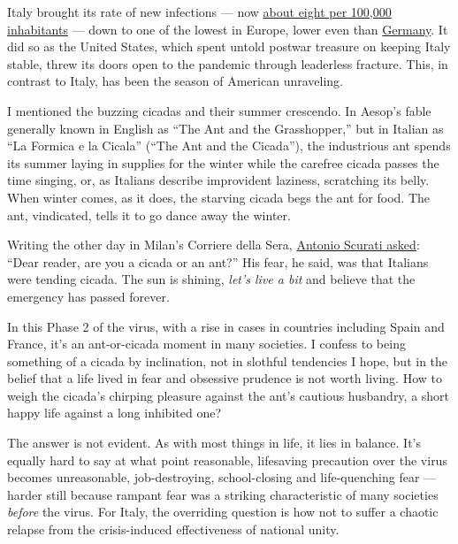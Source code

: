Italy brought its rate of new infections --- now
\href{https://www.nytimes3xbfgragh.onion/interactive/2020/world/europe/italy-coronavirus-cases.html}{about
eight per 100,000 inhabitants} --- down to one of the lowest in Europe,
lower even than
\href{https://www.nytimes3xbfgragh.onion/interactive/2020/world/europe/germany-coronavirus-cases.html}{Germany}.
It did so as the United States, which spent untold postwar treasure on
keeping Italy stable, threw its doors open to the pandemic through
leaderless fracture. This, in contrast to Italy, has been the season of
American unraveling.

I mentioned the buzzing cicadas and their summer crescendo. In Aesop's
fable generally known in English as ``The Ant and the Grasshopper,'' but
in Italian as ``La Formica e la Cicala'' (``The Ant and the Cicada''),
the industrious ant spends its summer laying in supplies for the winter
while the carefree cicada passes the time singing, or, as Italians
describe improvident laziness, scratching its belly. When winter comes,
as it does, the starving cicada begs the ant for food. The ant,
vindicated, tells it to go dance away the winter.

Writing the other day in Milan's Corriere della Sera,
\href{https://www.corriere.it/editoriali/20_agosto_11/alla-ricerca-normalitatra-pericolosi-cicaleggi-estivi-99a9717c-dc06-11ea-abc9-41b5baff53c0.shtml}{Antonio
Scurati asked}: ``Dear reader, are you a cicada or an ant?'' His fear,
he said, was that Italians were tending cicada. The sun is shining,
\emph{let's live a bit} and believe that the emergency has passed
forever.

In this Phase 2 of the virus, with a rise in cases in countries
including Spain and France, it's an ant-or-cicada moment in many
societies. I confess to being something of a cicada by inclination, not
in slothful tendencies I hope, but in the belief that a life lived in
fear and obsessive prudence is not worth living. How to weigh the
cicada's chirping pleasure against the ant's cautious husbandry, a short
happy life against a long inhibited one?

The answer is not evident. As with most things in life, it lies in
balance. It's equally hard to say at what point reasonable, lifesaving
precaution over the virus becomes unreasonable, job-destroying,
school-closing and life-quenching fear --- harder still because rampant
fear was a striking characteristic of many societies \emph{before} the
virus. For Italy, the overriding question is how not to suffer a chaotic
relapse from the crisis-induced effectiveness of national unity.

